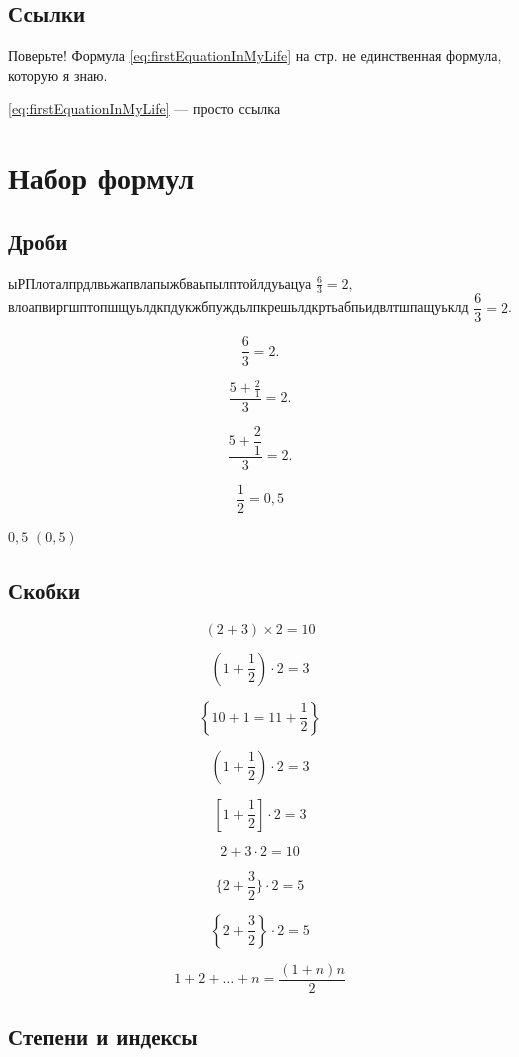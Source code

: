 \documentclass[a4paper,12pt]{article} %
\begin{document}
\subsection{Ссылки}


Поверьте! Формула \eqref{eq:firstEquationInMyLife} на стр. \pageref{eq:firstEquationInMyLife} не единственная формула, которую я знаю.

\ref{eq:firstEquationInMyLife} --- просто ссылка

\section{Набор формул}

\subsection{Дроби}
ыРПлоталпрдлвьжапвлапыжбваьпылптойлдуьацуа
$ \frac{6}{3}=2 $, %
влоапвиргшптопшщуьлдкпдукжбпуждьлпкрешьлдкртьабпьидвлтшпащуьклд
$ \dfrac{6}{3}=2$. %


$$
\frac{6}{3}=2.
$$

$$
\frac{5+\frac{2}{1}}{3}=2.
$$

$$
\frac{5+\dfrac{2}{1}}{3}=2.
$$

$$
\frac{1}{2}=0,5
$$

$0,5$  $(0, 5)$ %

\subsection{Скобки}

$$
(2+3)\times2=10
$$

$$
(1+\frac{1}{2})\cdot 2=3
$$

$$
\left\{10+1=11 + \dfrac{1}{2} \right\}
$$

$$
\left(1+\frac{1}{2}\right) \cdot 2=3
$$

$$
\left[1+\frac{1}{2}\right] \cdot 2=3
$$

$$
{2+3}\cdot2=10
$$

$$
\{2+\frac{3}{2}\}\cdot2=5
$$

$$
\left\{2+\frac{3}{2}\right\}\cdot2=5
$$

$$
1+2+\ldots+n=\frac{(1+n)n}{2}
$$

\subsection{Степени  и индексы}
\end{document}
